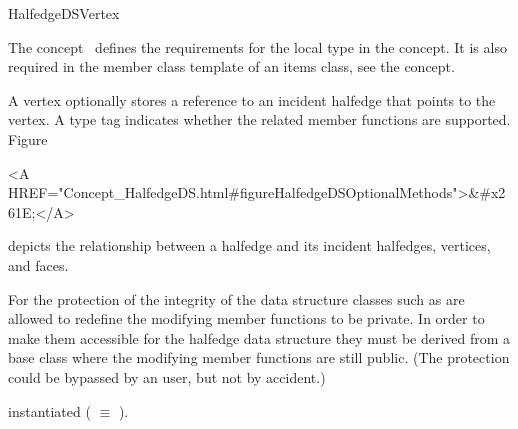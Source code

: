 
\ccRefPageBegin



\begin{ccRefConcept}{HalfedgeDSVertex}
\label{pageHalfedgeDSItemsVertexRef}

\ccDefinition
  
The concept \ccRefName\ defines the requirements for the local  
type in the  concept. It is also required in 
the  member class template of an
items class, see the  concept.


A vertex optionally stores a reference to an incident halfedge that
points to the vertex. A type tag indicates whether the related member
functions are supported. 
Figure~\begin{ccHtmlOnly}
  <A HREF="Concept_HalfedgeDS.html#figureHalfedgeDSOptionalMethods">&#x261E;</A>
\end{ccHtmlOnly}
depicts the relationship between a halfedge and its incident
halfedges, vertices, and faces.

For the protection of the integrity of the data structure classes such as
 are allowed to redefine the modifying member 
functions to be private. In order to make them accessible for the 
halfedge data structure they must be derived from a base class 
where the modifying member functions are still public. (The protection 
could be bypassed by an user, but not by accident.)

\ccTypes
{}
\ccThreeToTwo

    {instantiated  ( $\equiv$ ).}
\ccGlue
{}
\ccGlue
{}
\ccGlue
{}
\ccGlue
{}
\ccGlue
{}
\ccGlue
{}
\ccGlue
{}
\ccGlue
{}
\ccGlue
{}
\ccGlue
{}


\end{ccRefConcept}
